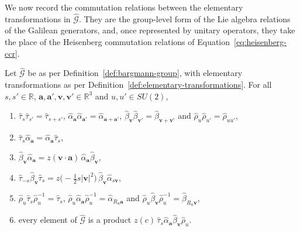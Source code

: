We now record the commutation relations between the elementary transformations in $\widehat{\mathcal{G}}$. They are the group-level form of the Lie algebra relations of the Galilean generators, and, once represented by unitary operators, they take the place of the Heisenberg commutation relations of Equation~\eqref{eq:heisenberg-ccr}.

\begin{lemma}\label{lem:galilei-relations}
	Let $\widehat{\mathcal{G}}$ be as per Definition~\ref{def:bargmann-group}, with elementary transformations as per Definition~\ref{def:elementary-transformations}. For all $s,s'\in\mathbb{R}$, $\mathbf{a},\mathbf{a}',\mathbf{v},\mathbf{v}'\in\mathbb{R}^3$ and $u,u'\in SU(2)$,
	\begin{enumerate}
		\item $\hat\tau_s\hat\tau_{s'}=\hat\tau_{s+s'}$, $\hat\alpha_{\mathbf{a}}\hat\alpha_{\mathbf{a}'}=\hat\alpha_{\mathbf{a}+\mathbf{a}'}$, $\hat\beta_{\mathbf{v}}\hat\beta_{\mathbf{v}'}=\hat\beta_{\mathbf{v}+\mathbf{v}'}$ and $\hat\rho_u\hat\rho_{u'}=\hat\rho_{uu'}$,
		\item $\hat\tau_s\hat\alpha_{\mathbf{a}}=\hat\alpha_{\mathbf{a}}\hat\tau_s$,
		\item $\hat\beta_{\mathbf{v}}\hat\alpha_{\mathbf{a}}=z(\mathbf{v}\cdot\mathbf{a})\,\hat\alpha_{\mathbf{a}}\hat\beta_{\mathbf{v}}$,
		\item $\hat\tau_{-s}\hat\beta_{\mathbf{v}}\hat\tau_{s}=z\big(-\tfrac{1}{2}s|\mathbf{v}|^2\big)\,\hat\beta_{\mathbf{v}}\hat\alpha_{s\mathbf{v}}$,
		\item $\hat\rho_u\hat\tau_s\hat\rho_u^{-1}=\hat\tau_s$, $\hat\rho_u\hat\alpha_{\mathbf{a}}\hat\rho_u^{-1}=\hat\alpha_{R_u\mathbf{a}}$ and $\hat\rho_u\hat\beta_{\mathbf{v}}\hat\rho_u^{-1}=\hat\beta_{R_u\mathbf{v}}$,
		\item every element of $\widehat{\mathcal{G}}$ is a product $z(c)\,\hat\tau_s\hat\alpha_{\mathbf{a}}\hat\beta_{\mathbf{v}}\hat\rho_u$.
	\end{enumerate}
\end{lemma}

